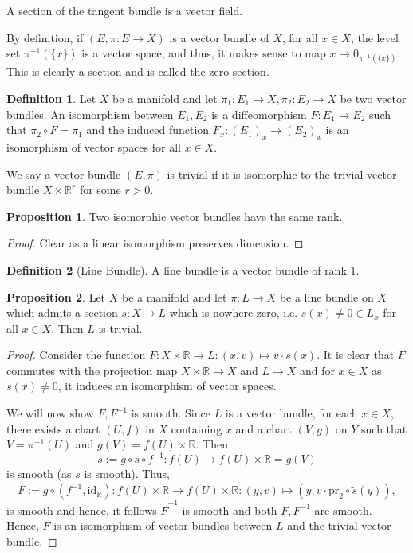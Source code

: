 \documentclass[]{article}
\theoremstyle{definition}
\theoremstyle{definition}
\newtheorem{definition}{Definition}[section]
\newtheorem{proposition}{Proposition}[section]
\begin{document}
A section of the tangent bundle is a vector field. 

By definition, if \((E, \pi : E \to X)\) is a vector bundle of \(X\), for 
all \(x \in X\), the level set \(\pi^{-1}(\{x\})\) is a vector space, and thus, 
it makes sense to map \(x \mapsto 0_{\pi^{-1}(\{x\})}\). This is clearly a 
section and is called the zero section.

\begin{definition}
  Let \(X\) be a manifold and let \(\pi_1 : E_1 \to X, \pi_2 : E_2 \to X\) be 
  two vector bundles. An isomorphism between \(E_1, E_2\) is a diffeomorphism 
  \(F : E_1 \to E_2\) such that \(\pi_2 \circ F = \pi_1\) and the induced 
  function \(F_x : (E_1)_x \to (E_2)_x\) is an isomorphism of vector spaces 
  for all \(x \in X\).
\end{definition}

We say a vector bundle \((E, \pi)\) is trivial if it is isomorphic to the 
trivial vector bundle \(X \times \mathbb{R}^r\) for some \(r > 0\).

\begin{proposition}
  Two isomorphic vector bundles have the same rank.
\end{proposition}
\begin{proof}
  Clear as a linear isomorphism preserves dimension.
\end{proof}

\begin{definition}[Line Bundle]
  A line bundle is a vector bundle of rank 1.
\end{definition}

\begin{proposition}
  Let \(X\) be a manifold and let \(\pi : L \to X\) be a line bundle on 
  \(X\) which admits a section \(s : X \to L\) which is nowhere zero, i.e. 
  \(s(x) \neq 0 \in L_x\) for all \(x \in X\). Then \(L\) is trivial.
\end{proposition}
\begin{proof}
  Consider the function \(F : X \times \mathbb{R} \to L : (x, v) \mapsto v \cdot s(x)\).
  It is clear that \(F\) commutes with the projection map \(X \times \mathbb{R} \to X\) 
  and \(L \to X\) and for \(x \in X\) as \(s(x) \neq 0\), it induces an 
  isomorphism of vector spaces. 

  We will now show \(F, F^{-1}\) is smooth. Since \(L\) is a vector bundle, 
  for each \(x \in X\), there exists a chart \((U, f)\) in \(X\) containing 
  \(x\) and a chart \((V, g)\) on \(Y\) such that \(V = \pi^{-1}(U)\) and 
  \(g(V) = f(U) \times \mathbb{R}\). Then 
  \[\tilde s := g \circ s \circ f^{-1} : f(U) \to f(U) \times \mathbb{R} = g(V)\]
  is smooth (as \(s\) is smooth). Thus, 
  \[\tilde F := g \circ (f^{-1}, \text{id}_{\mathbb{R}}) : 
    f(U) \times \mathbb{R} \to f(U) \times \mathbb{R} : 
    (y, v) \mapsto (y, v \cdot \text{pr}_2 \circ \tilde s(y)),\]
  is smooth and hence, it follows \(\tilde F^{-1}\) is smooth and both 
  \(F, F^{-1}\) are smooth. Hence, \(F\) is an isomorphism of vector bundles 
  between \(L\) and the trivial vector bundle.
\end{proof}
\end{document}
